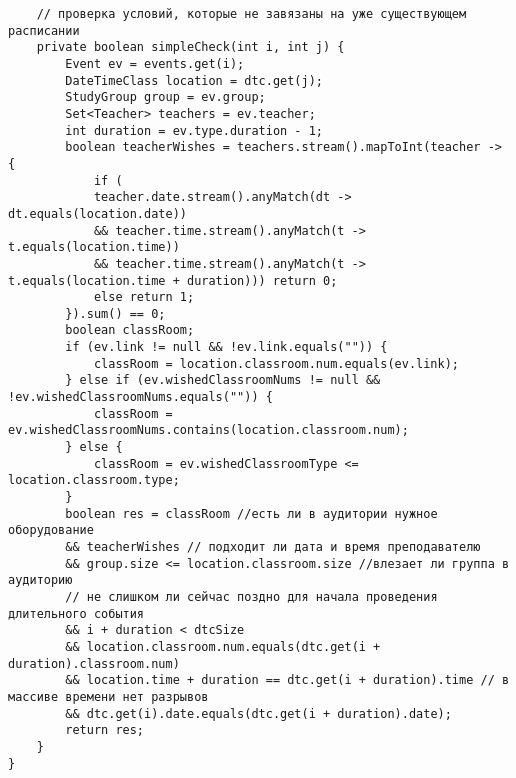 \begin{lstlisting}
	// проверка условий, которые не завязаны на уже существующем расписании
	private boolean simpleCheck(int i, int j) {
		Event ev = events.get(i);
		DateTimeClass location = dtc.get(j);
		StudyGroup group = ev.group;
		Set<Teacher> teachers = ev.teacher;
		int duration = ev.type.duration - 1;
		boolean teacherWishes = teachers.stream().mapToInt(teacher -> {
			if (
			teacher.date.stream().anyMatch(dt -> dt.equals(location.date))
			&& teacher.time.stream().anyMatch(t -> t.equals(location.time))
			&& teacher.time.stream().anyMatch(t -> t.equals(location.time + duration))) return 0;
			else return 1;
		}).sum() == 0;
		boolean classRoom;
		if (ev.link != null && !ev.link.equals("")) {
			classRoom = location.classroom.num.equals(ev.link);
		} else if (ev.wishedClassroomNums != null && !ev.wishedClassroomNums.equals("")) {
			classRoom = ev.wishedClassroomNums.contains(location.classroom.num);
		} else {
			classRoom = ev.wishedClassroomType <= location.classroom.type;
		}
		boolean res = classRoom //есть ли в аудитории нужное оборудование
		&& teacherWishes // подходит ли дата и время преподавателю
		&& group.size <= location.classroom.size //влезает ли группа в аудиторию
		// не слишком ли сейчас поздно для начала проведения длительного события
		&& i + duration < dtcSize
		&& location.classroom.num.equals(dtc.get(i + duration).classroom.num)
		&& location.time + duration == dtc.get(i + duration).time // в массиве времени нет разрывов
		&& dtc.get(i).date.equals(dtc.get(i + duration).date);
		return res;
	}
}
\end{lstlisting}